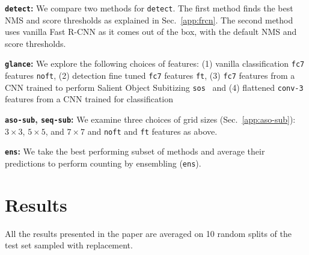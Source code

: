\documentclass[10pt,twocolumn,letterpaper]{article}
\newcommand{\detect}{\texttt{detect}\xspace}
\newcommand{\sub}{\texttt{aso-sub}\xspace}
\newcommand{\seq}{\texttt{seq-sub}\xspace}
\newcommand{\glance}{\texttt{glance}\xspace}
\newcommand{\ens}{\texttt{ens}\xspace}
\begin{document}
\noindent \textbf{\detect{}:} We compare two methods for \detect. The first method finds the best NMS and score thresholds as explained in Sec.~\ref{app:frcn}. The second method uses vanilla Fast R-CNN as it comes out of the box, with the default NMS and score thresholds.



\noindent \textbf{\glance{}:} We explore the following choices of features: (1) vanilla classification \texttt{fc7} features \texttt{noft}, (2) detection fine tuned \texttt{fc7} features \texttt{ft}, (3) \texttt{fc7} features from a CNN trained to perform Salient Object Subitizing \texttt{sos}~\cite{zhang2015salient} and (4) flattened \texttt{conv-3} features from a CNN trained for classification  

\noindent \textbf{\sub{}, \seq{}:} We examine three choices of grid sizes (Sec.~\ref{app:aso-sub}): $3\times3$, $5\times5$, and $7\times7$ and \texttt{noft} and \texttt{ft} features as above.  

\noindent \textbf{\ens{}:} We take the best performing subset of methods and average their predictions to perform counting by ensembling (\ens{}).

\begin{comment}
\subsection{Datasets}
\subsubsection{PASCAL}
statistics on the datasets relevant to counting
how many objects in each discretization of associative subitizing
\subsubsection{NYU v2}
\subsubsection{COCO}
\end{comment}

 
\section{Results}\label{sec:res}
All the results presented in the paper are averaged on 10 random splits of the test set sampled with replacement. 
\end{document}

